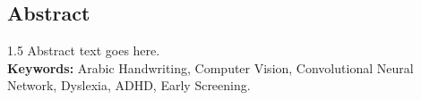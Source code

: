 \begin{center}
  \section*{Abstract}
\end{center}


\begin{spacing}{1.5}
Abstract text goes here.\\

{\bf Keywords:} Arabic Handwriting, Computer Vision, Convolutional Neural Network, Dyslexia, ADHD, Early Screening.
\end{spacing}
\clearpage
